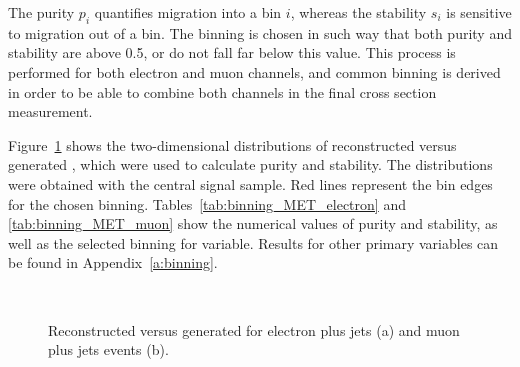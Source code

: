 The purity $p_i$ quantifies migration into a bin $i$, whereas the stability $s_i$ is sensitive to migration out of a
bin. The binning is chosen in such way that both purity and stability are above \num{0.5}, or do not fall far below this
value. This process is performed for both electron and muon channels, and common binning is derived in order to be able
to combine both channels in the final cross section measurement.

Figure~\ref{fig:choice_of_bins_MET} shows the two-dimensional distributions of reconstructed versus generated \MET,
which were used to calculate purity and stability. The distributions were obtained with the central signal
\ttbar sample. Red lines represent the bin edges for the chosen binning. Tables~\ref{tab:binning_MET_electron} and
\ref{tab:binning_MET_muon} show the numerical values of purity and stability, as well as the selected binning for \MET
variable. Results for other primary variables can be found in Appendix~\ref{a:binning}.



\begin{figure}[!htbp]
	\centering
	\hfill
	\\
	\caption[Reconstructed versus generated \MET]{Reconstructed versus generated \MET for electron plus jets (a) and
	muon plus jets events (b).}
	\label{fig:choice_of_bins_MET}
 \end{figure}

